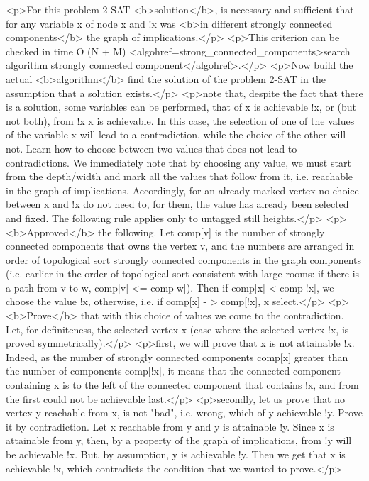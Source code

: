 <p>For this problem 2-SAT <b>solution</b>, is necessary and sufficient that for any variable x of node x and !x was <b>in different strongly connected components</b> the graph of implications.</p>
<p>This criterion can be checked in time O (N + M) <algohref=strong_connected_components>search algorithm strongly connected component</algohref>.</p>
<p>Now build the actual <b>algorithm</b> find the solution of the problem 2-SAT in the assumption that a solution exists.</p>
<p>note that, despite the fact that there is a solution, some variables can be performed, that of x is achievable !x, or (but not both), from !x x is achievable. In this case, the selection of one of the values of the variable x will lead to a contradiction, while the choice of the other will not. Learn how to choose between two values that does not lead to contradictions. We immediately note that by choosing any value, we must start from the depth/width and mark all the values that follow from it, i.e. reachable in the graph of implications. Accordingly, for an already marked vertex no choice between x and !x do not need to, for them, the value has already been selected and fixed. The following rule applies only to untagged still heights.</p>
<p><b>Approved</b> the following. Let comp[v] is the number of strongly connected components that owns the vertex v, and the numbers are arranged in order of topological sort strongly connected components in the graph components (i.e. earlier in the order of topological sort consistent with large rooms: if there is a path from v to w, comp[v] <= comp[w]). Then if comp[x] < comp[!x], we choose the value !x, otherwise, i.e. if comp[x] - > comp[!x], x select.</p>
<p><b>Prove</b> that with this choice of values we come to the contradiction. Let, for definiteness, the selected vertex x (case where the selected vertex !x, is proved symmetrically).</p>
<p>first, we will prove that x is not attainable !x. Indeed, as the number of strongly connected components comp[x] greater than the number of components comp[!x], it means that the connected component containing x is to the left of the connected component that contains !x, and from the first could not be achievable last.</p>
<p>secondly, let us prove that no vertex y reachable from x, is not "bad", i.e. wrong, which of y achievable !y. Prove it by contradiction. Let x reachable from y and y is attainable !y. Since x is attainable from y, then, by a property of the graph of implications, from !y will be achievable !x. But, by assumption, y is achievable !y. Then we get that x is achievable !x, which contradicts the condition that we wanted to prove.</p>
